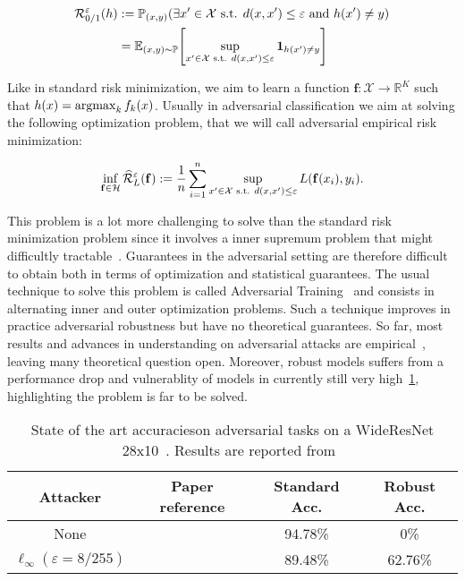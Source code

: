 \begin{align*}
\risk^\varepsilon_{0/1}(h)&:=\PP_{(x,y)}(\exists x'\in\XX\text{ s.t. } d(x,x')\leq \varepsilon \text{ and } h(x')\neq y)\\
&= \EE_{(x,y)\sim\PP}\left[\sup_{x'\in\XX\text{ s.t. } d(x,x')\leq \varepsilon}\mathbf{1}_{h(x')\neq y}\right]
\end{align*}


Like in standard risk minimization, we aim to learn a function $\mathbf{f}:\mathcal{X}\to\mathbb{R}^K$ such that $h(x)=\operatorname*{argmax}_k f_k(x)$. Usually in adversarial classification we aim at solving the following optimization problem, that we will call adversarial empirical risk minimization:

\begin{align*}
\inf_{\mathbf{f}\in\mathcal{H}}\widehat{\mathcal{R}}^\varepsilon_{L}(\mathbf{f}):= \frac{1}{n}\sum_{i=1}^n\sup_{x'\in\mathcal{X}\text{ s.t. } d(x,x')\leq \varepsilon} L(\mathbf{f}(x_i),y_i).
\end{align*}

This problem is a lot more challenging to solve than the standard risk minimization problem since it involves a inner supremum problem that might difficultly tractable~\citep{madry2017towards}. Guarantees in the adversarial setting are therefore difficult to obtain both in terms of optimization and statistical guarantees. The usual technique to solve this problem is called Adversarial Training~\citep{goodfellow2014explaining,madry2017towards} and consists in alternating inner and outer optimization problems. Such a technique improves in practice adversarial robustness but have no theoretical guarantees. So far, most results and advances in understanding on adversarial attacks are empirical~\citep{ilyas2019adversarial,rice2020overfitting}, leaving many theoretical question open.  Moreover, robust models suffers from a performance drop and vulnerablity of models in currently still very high~\ref{table:sota-cifar}, highlighting the problem is far to be solved.

\begin{table}[!ht]
    \centering
    \begin{tabular}{c|c|c|c}
       \textbf{Attacker}  &  \textbf{Paper reference} & \textbf{Standard Acc.} & \textbf{Robust Acc.}  \\ \hline
        None & \citep{ZagoruykoK16} & 94.78\% & 0\%\\
        $\ell_\infty (\varepsilon=8/255)$&  & 89.48\% & 62.76\%\\
    \end{tabular}
    \caption{State of the art accuracieson adversarial tasks on a WideResNet 28x10~\citep{ZagoruykoK16}. Results are reported from~\citep{croce2020robustbench}}
\label{table:sota-cifar}
\end{table}

